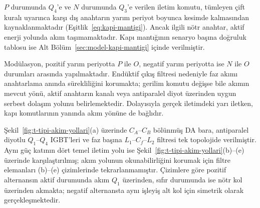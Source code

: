 $P$ durumunda $Q_4$'e ve $N$ durumunda $Q_3$'e verilen iletim komutu, tümleyen çift kuralı uyarınca karşı dış anahtarın yarım periyot boyunca kesimde kalmasından kaynaklanmaktadır (Eşitlik~\eqref{eq:kapi-mantigi}). Ancak ilgili nötr anahtar, aktif enerji yolunda akım taşımamaktadır. Kapı mantığının senaryo başına doğruluk tablosu ise Alt Bölüm~\ref{sec:model-kapi-mantigi} içinde verilmiştir.

Modülasyon, pozitif yarım periyotta $P$ ile $O$, negatif yarım periyotta ise $N$ ile $O$ durumları arasında yapılmaktadır. Endüktif çıkış filtresi nedeniyle faz akımı anahtarlama anında sürekliliğini korumakta; gerilim komutu değişse bile akımın mevcut yönü, aktif anahtarın kanalı veya antiparalel diyot üzerinden uygun serbest dolaşım yolunu belirlemektedir. Dolayısıyla gerçek iletimdeki yarı iletken, kapı komutlarının yanında akım yönüne de bağlıdır.

Şekil~\ref{fig:t-tipi-akim-yollari}(a) üzerinde $C_A$--$C_B$ bölünmüş DA bara, antiparalel diyotlu $Q_1$--$Q_4$ IGBT'leri ve faz başına $L_1$--$C_f$--$L_2$ filtresi tek topolojide verilmiştir. Aynı güç katının dört temel iletim yolu ise Şekil~\ref{fig:t-tipi-akim-yollari}(b)--(e) üzerinde karşılaştırılmış; akım yolunun okunabilirliğini korumak için filtre elemanları (b)--(e) çizimlerinde tekrarlanmamıştır. Çizimlere göre pozitif alternansın aktif durumunda akım $Q_1$ üzerinden, sıfır durumunda ise nötr kol üzerinden akmakta; negatif alternansta aynı işleyiş alt kol için simetrik olarak gerçekleşmektedir.

